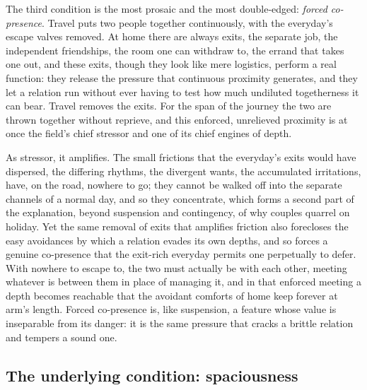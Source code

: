 The third condition is the most prosaic and the most double-edged: \emph{forced co-presence}. Travel puts two people together continuously, with the everyday's escape valves removed. At home there are always exits, the separate job, the independent friendships, the room one can withdraw to, the errand that takes one out, and these exits, though they look like mere logistics, perform a real function: they release the pressure that continuous proximity generates, and they let a relation run without ever having to test how much undiluted togetherness it can bear. Travel removes the exits. For the span of the journey the two are thrown together without reprieve, and this enforced, unrelieved proximity is at once the field's chief stressor and one of its chief engines of depth.

As stressor, it amplifies. The small frictions that the everyday's exits would have dispersed, the differing rhythms, the divergent wants, the accumulated irritations, have, on the road, nowhere to go; they cannot be walked off into the separate channels of a normal day, and so they concentrate, which forms a second part of the explanation, beyond suspension and contingency, of why couples quarrel on holiday. Yet the same removal of exits that amplifies friction also forecloses the easy avoidances by which a relation evades its own depths, and so forces a genuine co-presence that the exit-rich everyday permits one perpetually to defer. With nowhere to escape to, the two must actually be with each other, meeting whatever is between them in place of managing it, and in that enforced meeting a depth becomes reachable that the avoidant comforts of home keep forever at arm's length. Forced co-presence is, like suspension, a feature whose value is inseparable from its danger: it is the same pressure that cracks a brittle relation and tempers a sound one.

\subsection{The underlying condition: spaciousness}
\label{p21:sub:field-spaciousness}

